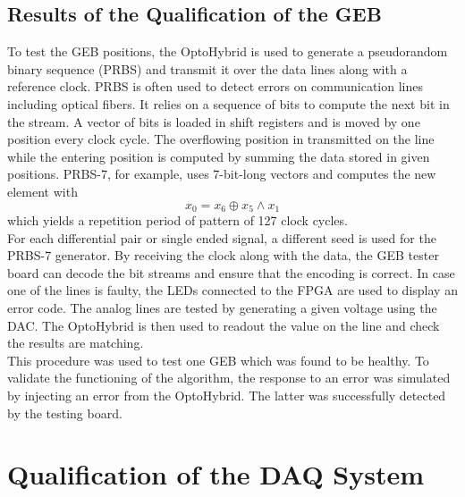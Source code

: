     \subsection{Results of the Qualification of the GEB}

      To test the GEB positions, the OptoHybrid is used to generate a pseudorandom binary sequence (PRBS) and transmit it over the data lines along with a reference clock. PRBS is often used to detect errors on communication lines including optical fibers. It relies on a sequence of bits to compute the next bit in the stream. A vector of bits is loaded in shift registers and is moved by one position every clock cycle. The overflowing position in transmitted on the line while the entering position is computed by summing the data stored in given positions. PRBS-7, for example, uses 7-bit-long vectors and computes the new element with
      \begin{equation}
        x_0 = x_6 \oplus x_5 \land x_1
      \end{equation}
      which yields a repetition period of pattern of 127 clock cycles. \\

      For each differential pair or single ended signal, a different seed is used for the PRBS-7 generator. By receiving the clock along with the data, the GEB tester board can decode the bit streams and ensure that the encoding is correct. In case one of the lines is faulty, the LEDs connected to the FPGA are used to display an error code. The analog lines are tested by generating a given voltage using the DAC. The OptoHybrid is then used to readout the value on the line and check the results are matching. \\

      This procedure was used to test one GEB which was found to be healthy. To validate the functioning of the algorithm, the response to an error was simulated by injecting an error from the OptoHybrid. The latter was successfully detected by the testing board.

  \section{Qualification of the DAQ System}

